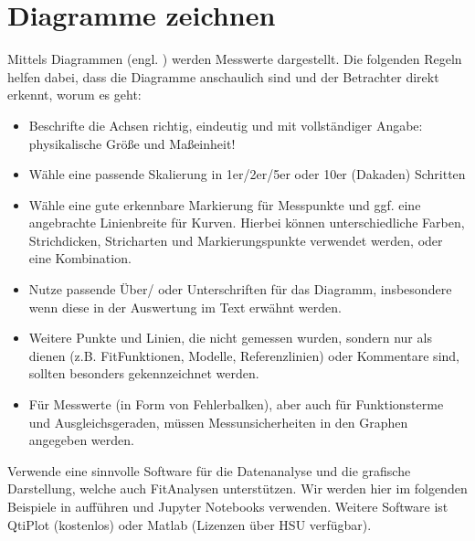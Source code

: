 \documentclass[letterpaper,10pt,english]{jupyterBook}
\begin{document}
\section{Diagramme zeichnen}
\label{\detokenize{content/0_Praktikum:diagramme-zeichnen}}
\sphinxAtStartPar
Mittels Diagrammen (engl. ) werden Messwerte dargestellt. Die folgenden Regeln helfen dabei, dass die Diagramme anschaulich sind und der Betrachter direkt erkennt, worum es geht:
\begin{itemize}
\item {} 
\sphinxAtStartPar
{} Beschrifte die Achsen richtig, eindeutig und mit vollständiger Angabe: physikalische Größe und Maßeinheit!

\item {} 
\sphinxAtStartPar
{} Wähle eine passende Skalierung in 1er\sphinxhyphen{}/2er\sphinxhyphen{}/5er oder 10er\sphinxhyphen{} (Dakaden) Schritten

\item {} 
\sphinxAtStartPar
{} Wähle eine gute erkennbare Markierung für Messpunkte und ggf. eine angebrachte Linienbreite für Kurven. Hierbei können unterschiedliche Farben, Strichdicken, Stricharten und Markierungspunkte verwendet werden, oder eine Kombination.

\item {} 
\sphinxAtStartPar
{} Nutze passende Über\sphinxhyphen{}/ oder Unterschriften für das Diagramm, insbesondere wenn diese in der Auswertung im Text erwähnt werden.

\item {} 
\sphinxAtStartPar
{} Weitere Punkte und Linien, die nicht gemessen wurden, sondern nur als  dienen (z.B. Fit\sphinxhyphen{}Funktionen, Modelle, Referenzlinien) oder Kommentare sind, sollten besonders gekennzeichnet werden.

\item {} 
\sphinxAtStartPar
{} Für Messwerte (in Form von Fehlerbalken), aber auch für Funktionsterme und Ausgleichsgeraden, müssen Messunsicherheiten in den Graphen angegeben werden.

\end{itemize}

\sphinxAtStartPar
Verwende eine sinnvolle Software für die Datenanalyse und die grafische Darstellung, welche auch Fit\sphinxhyphen{}Analysen unterstützen. Wir werden hier im folgenden Beispiele in  aufführen und Jupyter Notebooks verwenden.
Weitere Software ist Qti\sphinxhyphen{}Plot (kostenlos) oder Matlab (Lizenzen über HSU verfügbar).
\end{document}

